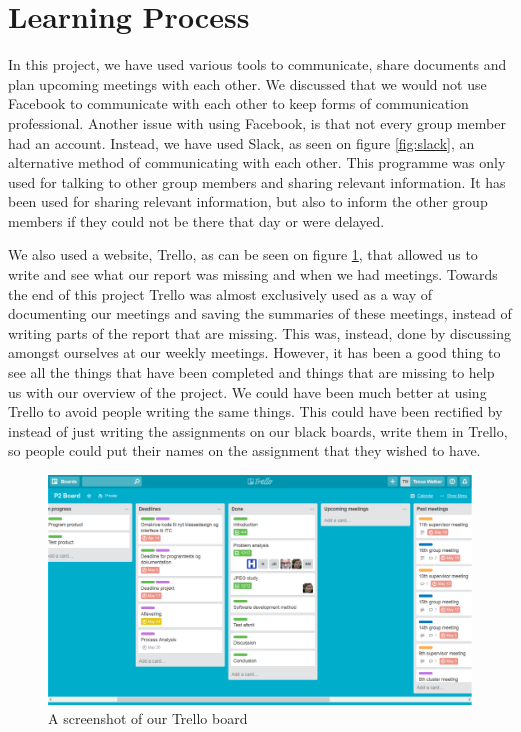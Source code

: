 \begin{figure}
	\centering
	
\end{figure}

\section{Learning Process}
In this project, we have used various tools to communicate, share documents and plan upcoming meetings with each other. 
We discussed that we would not use Facebook to communicate with each other to keep forms of communication professional.
Another issue with using Facebook, is that not every group member had an account.
Instead, we have used Slack, as seen on figure \ref{fig:slack}, an alternative method of communicating with each other. 
This programme was only used for talking to other group members and sharing relevant information. 
It has been used for sharing relevant information, but also to inform the other group members if they could not be there that day or were delayed. 

We also used a website, Trello, as can be seen on figure \ref{fig:trello}, that allowed us to write and see what our report was missing and when we had meetings. 
Towards the end of this project Trello was almost exclusively used as a way of documenting our meetings and saving the summaries of these meetings, instead of writing parts of the report that are missing. 
This was, instead, done by discussing amongst ourselves at our weekly meetings.
However, it has been a good thing to see all the things that have been completed and things that are missing to help us with our overview of the project.
We could have been much better at using Trello to avoid people writing the same things.
This could have been rectified by instead of just writing the assignments on our black boards, write them in Trello, so people could put their names on the assignment that they wished to have.

\begin{figure}
	\centering
	\includegraphics[width=1 \textwidth]{figures/trello.png}
	\caption{A screenshot of our Trello board}
	\label{fig:trello}
\end{figure}

